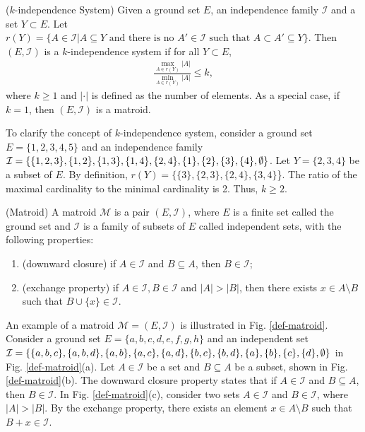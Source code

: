 \begin{definition} \label{def:k-independence-system} ($k$-independence System) \cite{korte1978analysis}
Given a ground set $E$, an independence family $\mathcal{I}$ and a set $Y\subset E$. Let $r(Y)=\{A \in \mathcal{I} | A\subseteq Y \text{ and there is no }A' \in \mathcal{I} \text{ such that } A\subset A' \subseteq Y \}$. Then $(E, \mathcal{I})$ is a $k$-independence system if for all $Y\subset E$,
\begin{align*}
    \frac{\max_{A\in r(Y)}|A|}{\min_{A\in r(Y)}|A|} \leq k,
\end{align*}
where $k\geq1$ and $|\cdot|$ is defined as the number of elements. As a special case, if $k=1$, then $(E, \mathcal{I})$ is a matroid. \\
\end{definition}

To clarify the concept of $k$-independence system, consider a ground set $E=\{1,2,3,4,5\}$ and an independence family $\mathcal{I}=\{\{1,2,3\},\{1,2\},\\ \{1,3\},\{1,4\},\{2,4\},\{1\},\{2\},\{3\}, \{4\},\emptyset \}$. Let $Y=\{2,3,4\}$ be a subset of $E$. By definition, $r(Y)=\{\{3\},\{2,3\},\{2,4\},\{3,4\}$\}. The ratio of the maximal cardinality to the minimal cardinality is 2. Thus, $k\geq2$.

\begin{definition} \label{def:matroid} (Matroid) \cite{nemhauser1978analysis}
A matroid $\mathcal{M}$ is a pair $(E, \mathcal{I})$, where $E$ is a finite set called the ground set and $\mathcal{I}$ is a family of subsets of $E$ called independent sets, with the following properties:
\begin{enumerate}
    \item (downward closure) if $A\in \mathcal{I}$ and $B \subseteq A$, then $B \in \mathcal{I}$;
    \item (exchange property) if $A \in \mathcal{I}, B\in \mathcal{I}$ and $|A|>|B|$, then there exists $x \in A\setminus B$ such that $B \cup \{x\} \in \mathcal{I}$.\\
\end{enumerate}
\end{definition}

An example of a matroid $\mathcal{M}=(E, \mathcal{I})$ is illustrated in Fig. \ref{def-matroid}.
Consider a ground set $E=\{a,b,c,d,e,f,g,h\}$ and an independent set $\mathcal{I}=\{\{a,b,c\}, \{a,b,d\}, \{a,b\}, \{a,c\}, \{a,d\}, \{b,c\}, \{b,d\}, \{a\}, \\ \{b\}, \{c\}, \{d\}, \emptyset \}$ in Fig. \ref{def-matroid}(a).
Let $A \in \mathcal{I}$ be a set and $B \subseteq A$ be a subset, shown in Fig. \ref{def-matroid}(b). The downward closure property states that if $A\in \mathcal{I}$ and $B \subseteq A$, then $B \in \mathcal{I}$. In Fig. \ref{def-matroid}(c), consider two sets $A \in \mathcal{I}$ and $B \in \mathcal{I}$, where $|A|>|B|$. By the exchange property, there exists an element $x \in A\setminus B$ such that $B+x \in \mathcal{I}$.\\

